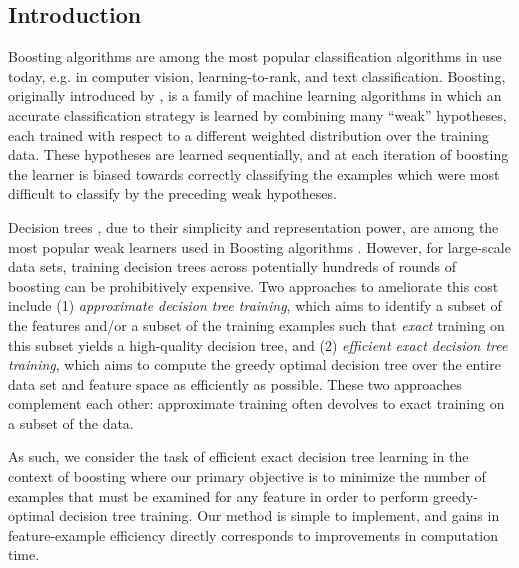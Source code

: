 \subsection{Introduction}\label{introduction}

Boosting algorithms are among the most popular classification
algorithms in use today, e.g. in computer vision, learning-to-rank,
and text classification.  Boosting, originally introduced by
\citet{Schapire90thestrength, Freund:1995:BWL:220262.220446,
  Freund:1996:ENB:3091696.3091715}, is a family of machine learning
algorithms in which an accurate classification strategy is learned by
combining many ``weak'' hypotheses, each trained with respect to a
different weighted distribution over the training data.  These
hypotheses are learned sequentially, and at each iteration of boosting
the learner is biased towards correctly classifying the examples which
were most difficult to classify by the preceding weak hypotheses.

Decision trees \citep{Quinlan:1993:CPM:152181}, due to their simplicity
and representation power, are among the most popular weak learners
used in Boosting algorithms \citep{Freund:1996:ENB:3091696.3091715,
  Quinlan:1996:BBC:1892875.1892983}.  However, for large-scale data
sets, training decision trees across potentially hundreds of rounds of
boosting can be prohibitively expensive.  Two approaches to ameliorate
this cost include
(1) \emph{approximate decision tree training},
which aims to identify a subset of the
features and/or a subset of the training examples such that
\emph{exact} training on this subset yields a high-quality decision
tree,
and (2)
\emph{efficient exact decision tree training},
which aims to compute the greedy optimal decision tree over the entire data
set and feature space as efficiently as possible.
These two approaches complement each other:
approximate training often devolves to exact
training on a subset of the data.

  As such, we
consider the task of efficient exact decision tree learning in the
context of boosting where our primary objective is to minimize the
number of examples that must be examined for any feature in order to
perform greedy-optimal decision tree training. 
Our method
is simple to implement, and gains in feature-example efficiency directly corresponds to improvements in computation time.


